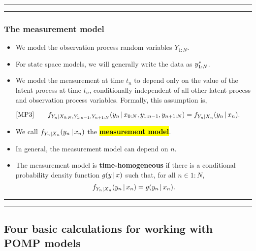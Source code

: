 \documentclass[]{article}
\begin{document}
\begin{center}\rule{0.5\linewidth}{\linethickness}\end{center}

\begin{center}\rule{0.5\linewidth}{\linethickness}\end{center}

\subsubsection{The measurement model}\label{the-measurement-model}

\begin{itemize}
\item
  We model the observation process random variables \(Y_{1:N}\).
\item
  For state space models, we will generally write the data as
  \(y_{1:N}^*\).
\item
  We model the measurement at time \(t_n\) to depend only on the value
  of the latent process at time \(t_n\), conditionally independent of
  all other latent process and observation process variables. Formally,
  this assumption is,
\end{itemize}
$$\text{[MP3]}
\quad\quad f_{Y_n|X_{0:N},Y_{1:n-1},Y_{n+1:N}}(y_n{\, | \,} x_{0:N},y_{1:n-1},y_{n+1:N}) = f_{Y_n|X_n}(y_n{\, | \,} x_{n}).$$

\begin{itemize}
\item
  We call \(f_{Y_n|X_n}(y_n{\, | \,} x_{n})\) the \hl{\textbf{measurement
  model}}.
\item
  In general, the measurement model can depend on \(n\).
\item
  The measurement model is \textbf{time-homogeneous} if there is a
  conditional probability density function \(g(y{\, | \,} x)\) such that,
  for all \(n\in 1:N\),
  \[ f_{Y_n|X_n}(y_n{\, | \,} x_{n})= g(y_n{\, | \,} x_n).\]
\end{itemize}

\begin{center}\rule{0.5\linewidth}{\linethickness}\end{center}

\begin{center}\rule{0.5\linewidth}{\linethickness}\end{center}

\subsection{Four basic calculations for working with POMP
models}\label{four-basic-calculations-for-working-with-pomp-models}
\end{document}
